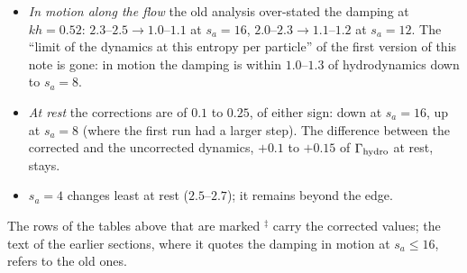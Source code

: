 \documentclass[11pt,aps,preprint,nofootinbib,superscriptaddress,tightenlines]{revtex4-2}
\begin{document}
\begin{itemize}
\item \emph{In motion along the flow} the old analysis over-stated the damping at $kh=0.52$: $2.3$--$2.5\to1.0$--$1.1$ at $s_a=16$, $2.0$--$2.3\to1.1$--$1.2$ at
  $s_a=12$.  The ``limit of the dynamics at this entropy per particle'' of the first version of this note is gone: in motion the damping is within
  $1.0$--$1.3$ of hydrodynamics down to $s_a=8$.
\item \emph{At rest} the corrections are of $0.1$ to $0.25$, of either sign: down at $s_a=16$, up at $s_a=8$ (where the first run had a larger step).  The
  difference between the corrected and the uncorrected dynamics, $+0.1$ to $+0.15$ of $\Gamma_{\rm hydro}$ at rest, stays.
\item \emph{$s_a=4$} changes least at rest ($2.5$--$2.7$); it remains beyond the edge.
\end{itemize}
The rows of the tables above that are marked $^\ddagger$ carry the corrected values; the text of the earlier sections, where it quotes the damping in
motion at $s_a\le16$, refers to the old ones.
\end{document}
